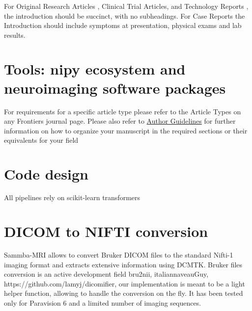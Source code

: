 \documentclass[utf8]{frontiersSCNS} %
\begin{document}
For Original Research Articles , Clinical Trial Articles, and Technology Reports , the introduction should be succinct, with no subheadings. For Case Reports the Introduction should include symptoms at presentation, physical exams and lab results.



\section{Tools: nipy ecosystem and neuroimaging software packages}

For requirements for a specific article type please refer to the Article Types on any Frontiers journal page. Please also refer to  \href{http://home.frontiersin.org/about/author-guidelines#Sections}{Author Guidelines} for further information on how to organize your manuscript in the required sections or their equivalents for your field


\section{Code design}
All pipelines rely on scikit-learn transformers
\section{DICOM to NIFTI conversion}
Sammba-MRI allows to convert Bruker DICOM files to the standard Nifti-1 
imaging format and extracts extensive information using DCMTK. 
Bruker files conversion is an active development field
bru2nii, italiannaveauGuy, https://github.com/lamyj/dicomifier,
our implementation is meant to be a light helper function, allowing to 
handle the conversion on the fly. It has been tested only for Paravision 6
and a limited number of imaging sequences.
\end{document}
